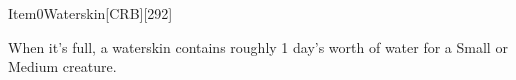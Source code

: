 
\begin{card}{Item}{0}{Waterskin}[CRB][292]

When it's full, a waterskin contains roughly 1 day's worth of water for a Small or Medium creature.

\vfill

\end{card}
